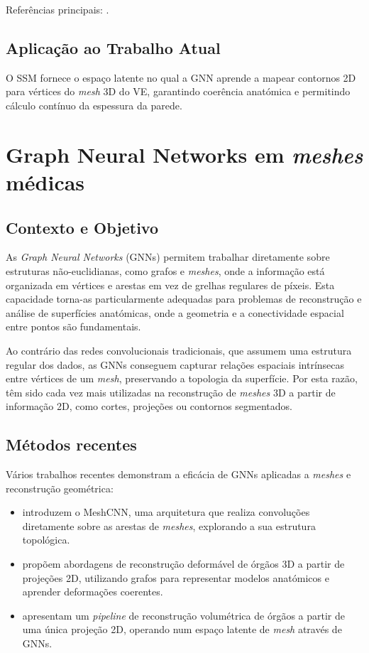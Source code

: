 \documentclass[12pt,a4paper]{report}
\begin{document}
Referências principais: \parencite{bai-2015,demarvao2014}.


\subsection*{Aplicação ao Trabalho Atual}
O SSM fornece o espaço latente no qual a GNN aprende a mapear contornos 2D para vértices do \textit{mesh} 3D do VE, garantindo coerência anatómica e permitindo cálculo contínuo da espessura da parede.

\section{Graph Neural Networks em \textit{meshes} médicas}

\subsection*{Contexto e Objetivo}
As \textit{Graph Neural Networks} (GNNs) permitem trabalhar diretamente sobre estruturas não-euclidianas, como grafos e \textit{meshes}, onde a informação está organizada em vértices e arestas em vez de grelhas regulares de píxeis. Esta capacidade torna-as particularmente adequadas para problemas de reconstrução e análise de superfícies anatómicas, onde a geometria e a conectividade espacial entre pontos são fundamentais.

Ao contrário das redes convolucionais tradicionais, que assumem uma estrutura regular dos dados, as GNNs conseguem capturar relações espaciais intrínsecas entre vértices de um \textit{mesh}, preservando a topologia da superfície. Por esta razão, têm sido cada vez mais utilizadas na reconstrução de \textit{meshes} 3D a partir de informação 2D, como cortes, projeções ou contornos segmentados.

\subsection*{Métodos recentes}
Vários trabalhos recentes demonstram a eficácia de GNNs aplicadas a \textit{meshes} e reconstrução geométrica:

\begin{itemize}
    \item \parencite{hanocka2019} introduzem o MeshCNN, uma arquitetura que realiza convoluções diretamente sobre as arestas de \textit{meshes}, explorando a sua estrutura topológica.
    
    \item \parencite{nakao2021,nakao2022} propõem abordagens de reconstrução deformável de órgãos 3D a partir de projeções 2D, utilizando grafos para representar modelos anatómicos e aprender deformações coerentes.
    
    \item \parencite{wijesinghe-2024} apresentam um \textit{pipeline} de reconstrução volumétrica de órgãos a partir de uma única projeção 2D, operando num espaço latente de \textit{mesh} através de GNNs.
\end{itemize}
\end{document}
